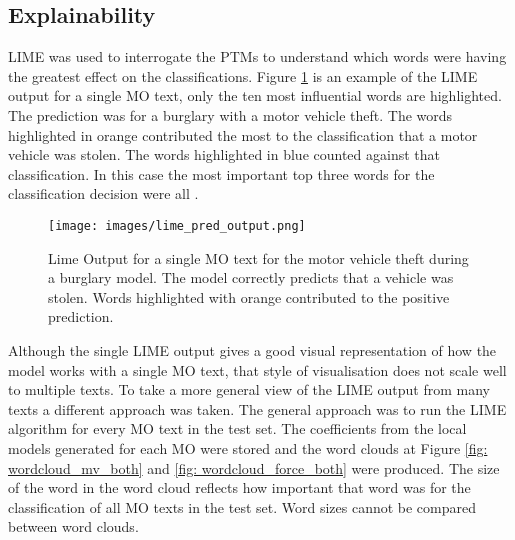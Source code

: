 \subsection{Explainability} LIME was used to interrogate the PTMs to understand which words were having the greatest effect on the classifications. Figure \ref{fig:lime_out1} is an example of the LIME output for a single MO text, only the ten most influential words are highlighted.  The prediction was for a burglary with a motor vehicle theft. The words highlighted in orange contributed the most to the classification that a motor vehicle was stolen. The words highlighted in blue counted against that classification. In this case the most important top three words for the classification decision were all . 

\begin{figure}[!tbp]
  \centering
    \texttt{[image: images/lime\_pred\_output.png]}
    \caption[Lime Output for a single MO text for the motor vehicle theft during a burglary model.]{ Lime Output for a single MO text for the motor vehicle theft during a burglary model. The model correctly predicts that a vehicle was stolen. Words highlighted with orange contributed to the positive prediction.}
    \label{fig:lime_out1}
\end{figure}



Although the single LIME output gives a good visual representation of how the model works with a single MO text, that style of visualisation does not scale well to multiple texts. To take a more general view of the LIME output from many texts a different approach was taken.   The general approach was to run the LIME algorithm for every MO text in the test set. The coefficients from the local models generated for each MO were stored and the word clouds at Figure \ref{fig: wordcloud_mv_both}  and \ref{fig: wordcloud_force_both} were produced. The size of the word in the word cloud reflects how important that word was for the classification of all MO texts in the test set. Word sizes cannot be compared between word clouds.  



